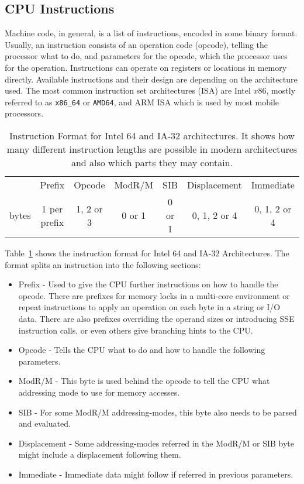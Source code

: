 \subsection{CPU Instructions}

Machine code, in general, is a list of instructions, encoded in some binary
format. Usually, an instruction consists of an operation code (opcode), telling
the processor what to do, and parameters for the opcode, which the processor
uses for the operation. Instructions can operate on registers or locations in
memory directly. Available instructions and their design are depending on the
architecture used. The most common instruction set architectures (ISA) are Intel
$x86$, mostly referred to as \texttt{x86\_64} or \texttt{AMD64}, and ARM ISA
which is used by most mobile processors.

\begin{table}[]
\begin{tabular}{ccccccc}
\cline{2-7}
\multicolumn{1}{c|}{} & \multicolumn{1}{c|}{Prefix} &
\multicolumn{1}{c|}{Opcode} & \multicolumn{1}{c|}{ModR/M} &
\multicolumn{1}{c|}{SIB} & \multicolumn{1}{c|}{Displacement} &
\multicolumn{1}{c|}{Immediate} \\ \cline{2-7}
bytes         & 1 per prefix                & 1, 2 or 3
 & 0 or 1                      & 0 or 1                   & 0, 1, 2 or 4
             & 0, 1, 2 or 4
\end{tabular}
\caption{Instruction Format for Intel 64 and IA-32 architectures. It shows how
many different instruction lengths are possible in modern architectures and
also which parts they may contain.}
\label{tab:instrfor}
\end{table}

Table~\ref{tab:instrfor} shows the instruction format for Intel 64 and IA-32
Architectures. The format splits an instruction into the following sections:

\begin{itemize}
  \item Prefix - Used to give the CPU further instructions on how to handle the
opcode. There are prefixes for memory locks in a multi-core environment or
repeat instructions to apply an operation on each byte in a string or I/O data.
There are also prefixes overriding the operand sizes or introducing SSE
instruction calls, or even others give branching hints to the CPU.
  \item Opcode - Tells the CPU what to do and how to handle the following
parameters.
  \item ModR/M - This byte is used behind the opcode to tell the CPU what
addressing mode to use for memory accesses.
  \item SIB - For some ModR/M addressing-modes, this byte also needs to be
parsed and evaluated.
  \item Displacement - Some addressing-modes referred in the ModR/M or SIB byte
might include a displacement following them.
  \item Immediate - Immediate data might follow if referred in previous
parameters.
\end{itemize}

